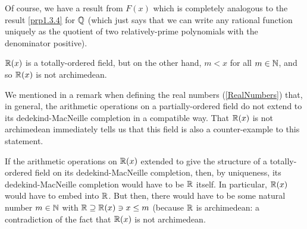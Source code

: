 Of course, we have a result from $F(x)$ which is completely analogous to the result \cref{prp1.3.4} for $\mathbb{Q}$ (which just says that we can write any rational function uniquely as the quotient of two relatively-prime polynomials with the denominator positive).
\begin{exm}\label{exm2.3.12}
$\mathbb{R} (x)$ is a totally-ordered field, but on the other hand, $m<x$ for all $m\in \mathbb{N}$, and so $\mathbb{R} (x)$ is not archimedean.
\end{exm}
We mentioned in a remark when defining the real numbers (\cref{RealNumbers}) that, in general, the arithmetic operations on a partially-ordered field do not extend to its dedekind-MacNeille completion in a compatible way.  That $\mathbb{R} (x)$ is not archimedean immediately tells us that this field is also a counter-example to this statement.
\begin{exm}\label{exm3.2.13}
If the arithmetic operations on $\mathbb{R} (x)$ extended to give the structure of a totally-ordered field on its dedekind-MacNeille completion, then, by uniqueness, its dedekind-MacNeille completion would have to be $\mathbb{R}$ itself.  In particular, $\mathbb{R} (x)$ would have to embed into $\mathbb{R}$.  But then, there would have to be some natural number $m\in \mathbb{N}$ with $\mathbb{R} \supseteq \mathbb{R} (x)\ni x\leq m$ (because $\mathbb{R}$ is archimedean:  a contradiction of the fact that $\mathbb{R} (x)$ is not archimedean.
\end{exm}

\horizontalrule


